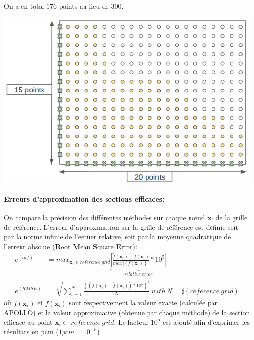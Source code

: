 On a en total $176$ points au lieu de $300$.
\begin{center}
\includegraphics[height= 7 cm,width = 0.7\linewidth]{images/nb_discretisation.png}
\end{center}


\paragraph{Erreurs d'approximation des sections efficaces:}
On compare la précision des différentes méthodes sur chaque nœud $\textbf{x}_i$ de la grille de référence.
L'erreur d'approximation sur la grille de référence est définie soit par la norme infinie de l'eeruer relative,
soit par la moyenne quadratique de l'erreur absolue (\textbf{R}oot \textbf{M}ean \textbf{S}quare \textbf{E}rror):
\begin{align}
		e^{(inf)} & = max_{\textbf{x}_i \in reference\ grid} \underbrace{ \left | \frac{\tilde{f}(\textbf{x}_i) - f(\textbf{x}_i)}{ max \left | \left \{ f(\textbf{x}_i) \right \} \right |} * 10^5 \right | }_{relative\ error} \\
		e^{(RMSE)} & = \sqrt{ \sum_{i=1}^N \frac{((f(\textbf{x}_i) - \tilde{f}(\textbf{x}_i)) * 10^5)^2}{N} }\ with\ N = \sharp(reference\ grid)
\end{align}
où $f(\textbf{x}_i)$ et $\tilde{f}(\textbf{x}_i)$ sont respectivement la valeur exacte (calculée par APOLLO) et la valeur approximative
(obtenue par chaque méthode) de la section efficace au point $\textbf{x}_i \in\ reference\ grid$. Le facteur $10^5$
est ajouté afin d'exprimer les résultats en pcm ($1pcm = 10^{-5}$)

